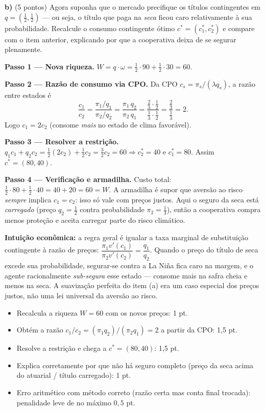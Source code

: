 \textbf{b)} (5 pontos) Agora suponha que o mercado precifique os títulos contingentes em $q=\left(\tfrac12,\tfrac12\right)$ --- ou seja, o título que paga na \emph{seca} ficou caro relativamente à sua probabilidade. Recalcule o consumo contingente ótimo $c^{*}=(c_1^{*},c_2^{*})$ e compare com o item anterior, explicando por que a cooperativa deixa de se segurar plenamente.
\resolucaobox{7.2cm}
\begin{solucao}
\textbf{Passo 1 --- Nova riqueza.} $W=q\cdot\omega=\tfrac12\cdot 90+\tfrac12\cdot 30=60$.

\textbf{Passo 2 --- Razão de consumo via CPO.} Da CPO $c_s=\pi_s/(\lambda q_s)$, a razão entre estados é
\[ \frac{c_1}{c_2}=\frac{\pi_1/q_1}{\pi_2/q_2}=\frac{\pi_1\,q_2}{\pi_2\,q_1}=\frac{\tfrac23\cdot\tfrac12}{\tfrac13\cdot\tfrac12}=\frac{\tfrac23}{\tfrac13}=2. \]
Logo $c_1=2c_2$ (consome \emph{mais} no estado de clima favorável).

\textbf{Passo 3 --- Resolver a restrição.} $q_1 c_1+q_2 c_2=\tfrac12(2c_2)+\tfrac12 c_2=\tfrac32 c_2=60\Rightarrow c_2^{*}=40$ e $c_1^{*}=80$. Assim $c^{*}=(80,40)$.

\textbf{Passo 4 --- Verificação e armadilha.} Custo total: $\tfrac12\cdot 80+\tfrac12\cdot 40=40+20=60=W$. A armadilha é supor que aversão ao risco \emph{sempre} implica $c_1=c_2$: isso só vale com preços justos. Aqui o seguro da seca está \emph{carregado} (preço $q_2=\tfrac12$ contra probabilidade $\pi_2=\tfrac13$), então a cooperativa compra menos proteção e aceita carregar parte do risco climático.

\textbf{Intuição econômica:} a regra geral é igualar a taxa marginal de substituição contingente à razão de preços: $\dfrac{\pi_1 v'(c_1)}{\pi_2 v'(c_2)}=\dfrac{q_1}{q_2}$. Quando o preço do título de seca excede sua probabilidade, segurar-se contra a La Niña fica caro na margem, e o agente racionalmente \emph{sub-segura} esse estado --- consome mais na safra cheia e menos na seca. A suavização perfeita do item (a) era um caso especial dos preços justos, não uma lei universal da aversão ao risco.
\rubricalabel
\begin{itemize}
\item Recalcula a riqueza $W=60$ com os novos preços: 1 pt.
\item Obtém a razão $c_1/c_2=(\pi_1 q_2)/(\pi_2 q_1)=2$ a partir da CPO: 1{,}5 pt.
\item Resolve a restrição e chega a $c^{*}=(80,40)$: 1{,}5 pt.
\item Explica corretamente por que não há seguro completo (preço da seca acima do atuarial / título carregado): 1 pt.
\item Erro aritmético com método correto (razão certa mas conta final trocada): penalidade leve de no máximo $0{,}5$ pt.
\end{itemize}
\end{solucao}

